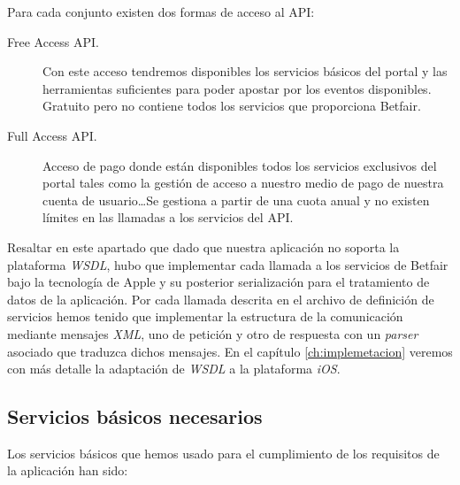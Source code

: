   Para cada conjunto existen dos formas de acceso al API:
\begin{description}
	\item [Free Access API.]  Con este acceso tendremos disponibles los servicios básicos del portal y las herramientas suficientes para poder apostar por los eventos disponibles. Gratuito pero no contiene todos los servicios que proporciona Betfair.
	\item [Full Access API.] Acceso de pago donde están disponibles todos los servicios exclusivos del portal tales como la gestión de acceso a nuestro medio de pago de nuestra cuenta de usuario\ldots Se gestiona a partir de una cuota anual y no existen límites en las llamadas a los servicios del API.
\end{description}

Resaltar en este apartado que dado que nuestra aplicación no soporta la plataforma \emph{WSDL}, hubo que implementar cada llamada a los servicios de Betfair bajo la tecnología de Apple y su posterior serialización para el tratamiento de datos de la aplicación. Por cada llamada descrita en el archivo de definición de servicios hemos tenido que implementar la estructura de la comunicación mediante mensajes \emph{XML}, uno de petición y otro de respuesta con un \emph{parser} asociado que traduzca dichos mensajes. En el capítulo \ref{ch:implemetacion} veremos con más detalle la adaptación de \emph{WSDL} a la plataforma \emph{iOS}.

\subsection{Servicios básicos necesarios}

    Los servicios básicos que hemos usado para el cumplimiento de los requisitos de la aplicación han sido:

